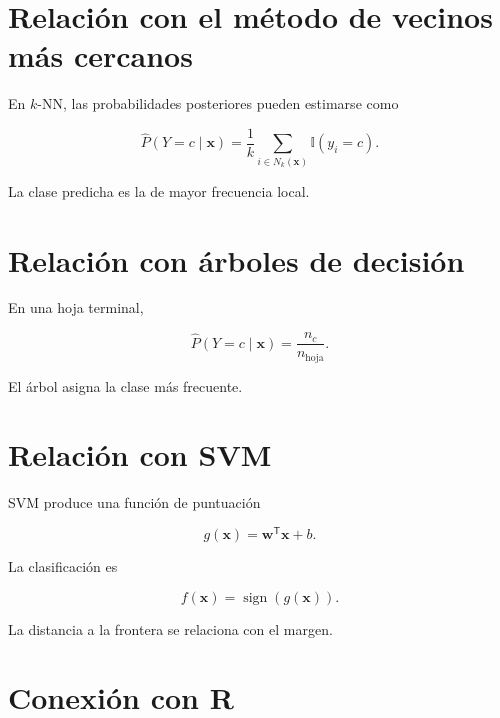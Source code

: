\documentclass[
  spanish,
  11pt,
  letterpaper,
  DIV=11,
  numbers=noendperiod]{scrreprt}
\theoremstyle{definition}
\theoremstyle{plain}
\theoremstyle{definition}
\theoremstyle{remark}
\begin{document}
\section{Relación con el método de vecinos más
cercanos}\label{relaciuxf3n-con-el-muxe9todo-de-vecinos-muxe1s-cercanos-1}

En \(k\)-NN, las probabilidades posteriores pueden estimarse como

\[
\widehat{P}(Y=c\mid\mathbf{x})
=
\frac{1}{k}
\sum_{i\in N_k(\mathbf{x})}
\mathbb{I}(y_i=c).
\]

La clase predicha es la de mayor frecuencia local.

\section{Relación con árboles de
decisión}\label{relaciuxf3n-con-uxe1rboles-de-decisiuxf3n-1}

En una hoja terminal,

\[
\widehat{P}(Y=c\mid\mathbf{x})
=
\frac{n_c}{n_{\text{hoja}}}.
\]

El árbol asigna la clase más frecuente.

\section{Relación con SVM}\label{relaciuxf3n-con-svm}

SVM produce una función de puntuación

\[
g(\mathbf{x})
=
\mathbf{w}^{\mathsf T}\mathbf{x}+b.
\]

La clasificación es

\[
f(\mathbf{x})
=
\operatorname{sign}
(
g(\mathbf{x})
).
\]

La distancia a la frontera se relaciona con el margen.

\section{Conexión con R}\label{conexiuxf3n-con-r-5}
\end{document}
